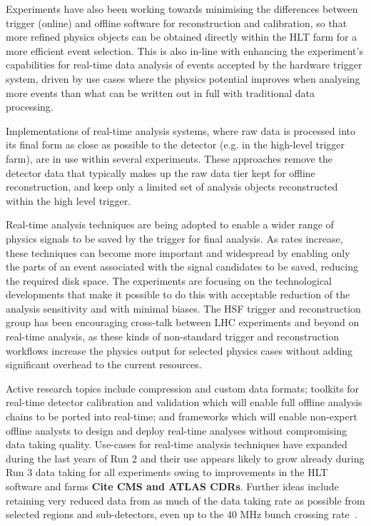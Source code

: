 Experiments have also been working towards minimising the differences
between trigger (online) and offline software for reconstruction and
calibration, so that more refined physics objects can be obtained
directly within the HLT farm for a more efficient event selection. This
is also in-line with enhancing the experiment's capabilities for
real-time data analysis of events accepted by the hardware trigger
system, driven by use cases where the physics potential improves when
analysing more events than what can be written out in full with
traditional data processing.

Implementations of real-time analysis systems, where raw data is
processed into its final form as close as possible to the detector (e.g.
in the high-level trigger farm), are in use within several experiments.
These approaches remove the detector data that typically makes up the
raw data tier kept for offline reconstruction, and keep only a limited
set of analysis objects reconstructed within the high level trigger.

Real-time analysis techniques are being adopted to enable a wider range
of physics signals to be saved by the trigger for final analysis. As
rates increase, these techniques can become more important and
widespread by enabling only the parts of an event associated with the
signal candidates to be saved, reducing the required disk space. The
experiments are focusing on the technological developments that make it
possible to do this with acceptable reduction of the analysis
sensitivity and with minimal biases. The HSF trigger and reconstruction
group has been encouraging cross-talk between LHC experiments and beyond
on real-time analysis, as these kinds of non-standard trigger and
reconstruction workflows increase the physics output for selected
physics cases without adding significant overhead to the current
resources.

Active research topics include compression and custom data formats;
toolkits for real-time detector calibration and validation which will
enable full offline analysis chains to be ported into real-time; and
frameworks which will enable non-expert offline analysts to design and
deploy real-time analyses without compromising data taking quality.
Use-cases for real-time analysis techniques have expanded during the
last years of Run 2 and their use appears likely to
grow already during Run 3 data taking for all experiments owing to
improvements in the HLT software and farms \textbf{Cite CMS and ATLAS CDRs}. Further ideas include retaining very reduced data from as much
of the data taking rate as possible from selected regions and
sub-detectors, even up to the 40 MHz bunch crossing rate~\cite{hannes_sakulin_2019_3598769}.


